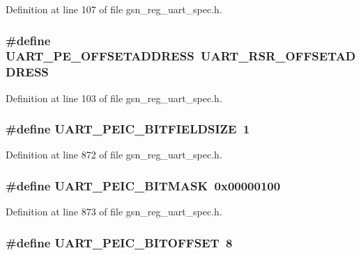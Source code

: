 Definition at line 107 of file gsn\_\-reg\_\-uart\_\-spec.h.

\hypertarget{a00575_ac0a9340d05ea41ed6d564cde4f442859}{
\subsubsection[{UART\_\-PE\_\-OFFSETADDRESS}]{\setlength{\rightskip}{0pt plus 5cm}\#define UART\_\-PE\_\-OFFSETADDRESS~UART\_\-RSR\_\-OFFSETADDRESS}}
\label{a00575_ac0a9340d05ea41ed6d564cde4f442859}


Definition at line 103 of file gsn\_\-reg\_\-uart\_\-spec.h.

\hypertarget{a00575_a29819b41b552d207b8925bf5f80951d0}{
\subsubsection[{UART\_\-PEIC\_\-BITFIELDSIZE}]{\setlength{\rightskip}{0pt plus 5cm}\#define UART\_\-PEIC\_\-BITFIELDSIZE~1}}
\label{a00575_a29819b41b552d207b8925bf5f80951d0}


Definition at line 872 of file gsn\_\-reg\_\-uart\_\-spec.h.

\hypertarget{a00575_a79e5cacee21f37538f8e517dd5f183bd}{
\subsubsection[{UART\_\-PEIC\_\-BITMASK}]{\setlength{\rightskip}{0pt plus 5cm}\#define UART\_\-PEIC\_\-BITMASK~0x00000100}}
\label{a00575_a79e5cacee21f37538f8e517dd5f183bd}


Definition at line 873 of file gsn\_\-reg\_\-uart\_\-spec.h.

\hypertarget{a00575_a50703869afe7e11e40ebf8031524d5ea}{
\subsubsection[{UART\_\-PEIC\_\-BITOFFSET}]{\setlength{\rightskip}{0pt plus 5cm}\#define UART\_\-PEIC\_\-BITOFFSET~8}}
\label{a00575_a50703869afe7e11e40ebf8031524d5ea}


